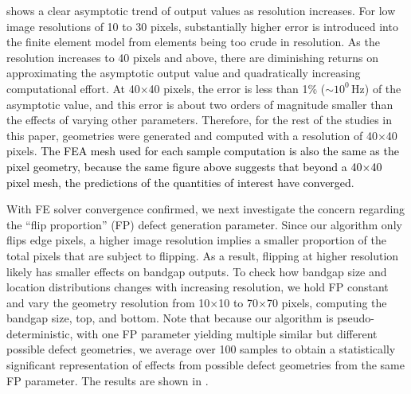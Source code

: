 \documentclass[preprint,review,12pt]{elsarticle}
\newcommand{\rev}[1]{\textcolor{black}{#1}}
\begin{document}
 shows a clear asymptotic trend of output values as resolution increases. For low image resolutions of 10 to 30 pixels, substantially higher error is introduced into the finite element model from elements being too crude in resolution. As the resolution increases to 40 pixels and above, there are diminishing returns on approximating the asymptotic output value and quadratically increasing computational effort. At 40$\times$40 pixels, the error is less than 1\% ($\sim 10^0\,\text{Hz}$) of the asymptotic value, and this error is about two orders of magnitude smaller than the effects of varying other parameters. Therefore, for the rest of the studies in this paper, geometries were generated and computed with a resolution of 40$\times$40 pixels. \rev{The FEA mesh used for each sample computation is also the same as the pixel geometry, because the same figure above suggests that beyond a 40$\times$40 pixel mesh, the predictions of the quantities of interest have converged}.

With FE solver convergence confirmed, we next investigate the concern regarding the ``flip proportion'' (FP) defect generation parameter. Since our algorithm only flips edge pixels, a higher image resolution implies a smaller proportion of the total pixels that are subject to flipping. As a result, flipping at higher resolution likely has smaller effects on bandgap outputs. To check how bandgap size and location distributions changes with increasing resolution, we hold FP constant and vary the geometry resolution from 10$\times$10 to 70$\times$70 pixels, computing the bandgap size, top, and bottom. Note that because our algorithm is pseudo-deterministic, with one FP parameter yielding multiple similar but different possible defect geometries, we average over 100 samples to obtain a statistically significant representation of effects from possible defect geometries from the same FP parameter. The results are shown in .
\end{document}
